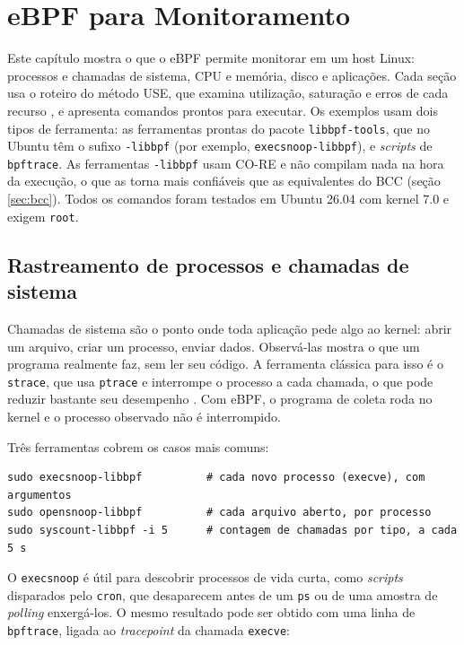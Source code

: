 \chapter{eBPF para Monitoramento}\label{cap:monitoramento}

Este capítulo mostra o que o eBPF permite monitorar em um host Linux: processos e chamadas de sistema, CPU e memória, disco e aplicações. Cada seção usa o roteiro do método USE, que examina utilização, saturação e erros de cada recurso \cite{gregg2020}, e apresenta comandos prontos para executar. Os exemplos usam dois tipos de ferramenta: as ferramentas prontas do pacote \texttt{libbpf-tools}, que no Ubuntu têm o sufixo \texttt{-libbpf} (por exemplo, \texttt{execsnoop-libbpf}), e \textit{scripts} de \texttt{bpftrace}. As ferramentas \texttt{-libbpf} usam CO-RE e não compilam nada na hora da execução, o que as torna mais confiáveis que as equivalentes do BCC (seção \ref{sec:bcc}). Todos os comandos foram testados em Ubuntu 26.04 com kernel 7.0 e exigem \texttt{root}.

\section{Rastreamento de processos e chamadas de sistema}

Chamadas de sistema são o ponto onde toda aplicação pede algo ao kernel: abrir um arquivo, criar um processo, enviar dados. Observá-las mostra o que um programa realmente faz, sem ler seu código. A ferramenta clássica para isso é o \texttt{strace}, que usa \texttt{ptrace} e interrompe o processo a cada chamada, o que pode reduzir bastante seu desempenho \cite{gregg2019}. Com eBPF, o programa de coleta roda no kernel e o processo observado não é interrompido.

Três ferramentas cobrem os casos mais comuns:

\begin{lstlisting}
sudo execsnoop-libbpf          # cada novo processo (execve), com argumentos
sudo opensnoop-libbpf          # cada arquivo aberto, por processo
sudo syscount-libbpf -i 5      # contagem de chamadas por tipo, a cada 5 s
\end{lstlisting}

O \texttt{execsnoop} é útil para descobrir processos de vida curta, como \textit{scripts} disparados pelo \texttt{cron}, que desaparecem antes de um \texttt{ps} ou de uma amostra de \textit{polling} enxergá-los. O mesmo resultado pode ser obtido com uma linha de \texttt{bpftrace}, ligada ao \textit{tracepoint} da chamada \texttt{execve}:

